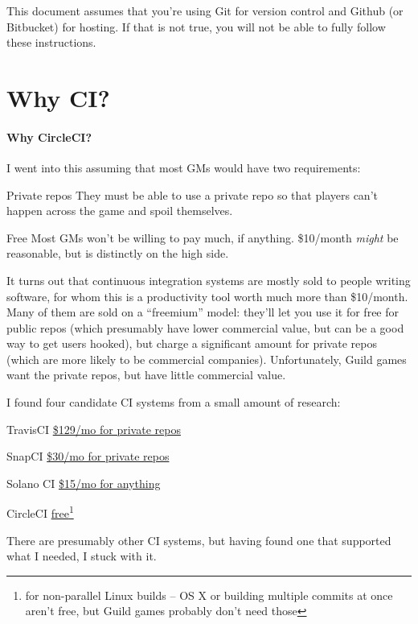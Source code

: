 \documentclass[green]{testgame}
\begin{document}
\newcommand{\ter}[1]{\fbox{\parbox{6.5in}{{\tt #1}}}}


This document assumes that you're using Git for version control and Github (or Bitbucket) for hosting. If that is not true, you will not be able to fully follow these instructions.

\section{Why CI?}

\begin{WrapText}
  \paragraph*{Why CircleCI?} I went into this assuming that most GMs would have two requirements:
  \begin{desc}
  \item[Private repos] They must be able to use a private repo so that players can't happen across the game and spoil themselves.
  \item[Free] Most GMs won't be willing to pay much, if anything. \$10/month \emph{might} be reasonable, but is distinctly on the high side.
  \end{desc}

  It turns out that continuous integration systems are mostly sold to people writing software, for whom this is a productivity tool worth much more than \$10/month. Many of them are sold on a ``freemium'' model: they'll let you use it for free for public repos (which presumably have lower commercial value, but can be a good way to get users hooked), but charge a significant amount for private repos (which are more likely to be commercial companies). Unfortunately, Guild games want the private repos, but have little commercial value.

  I found four candidate CI systems from a small amount of research:
  \begin{desc}
  \item[TravisCI] \href{https://travis-ci.com/plans}{\$129/mo for private repos}
  \item[SnapCI] \href{https://snap-ci.com/my_plans/}{\$30/mo for private repos}
  \item[Solano CI] \href{https://www.solanolabs.com/#pricing}{\$15/mo for anything}
  \item[CircleCI] \href{https://circleci.com/pricing/}{free\footnote{for non-parallel Linux builds -- OS X or building multiple commits at once aren't free, but Guild games probably don't need those}}
  \end{desc}

  There are presumably other CI systems, but having found one that supported what I needed, I stuck with it.
\end{WrapText}
\end{document}

